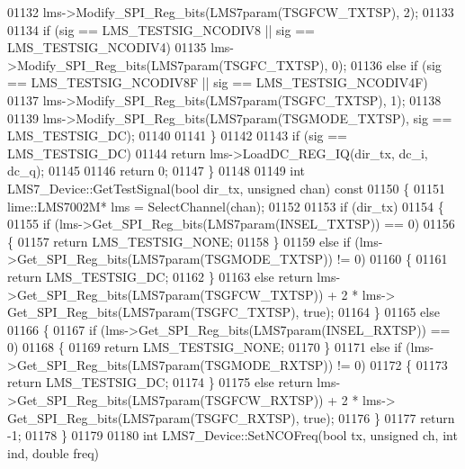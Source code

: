 \begin{DoxyCode}
{{{01132             lms->Modify_SPI_Reg_bits(LMS7param(TSGFCW_TXTSP), 2);
01133 
01134         \textcolor{keywordflow}{if} (sig == LMS_TESTSIG_NCODIV8 || sig == LMS_TESTSIG_NCODIV4)
01135             lms->Modify_SPI_Reg_bits(LMS7param(TSGFC_TXTSP), 0);
01136         \textcolor{keywordflow}{else} \textcolor{keywordflow}{if} (sig == LMS_TESTSIG_NCODIV8F || sig == LMS_TESTSIG_NCODIV4F)
01137             lms->Modify_SPI_Reg_bits(LMS7param(TSGFC_TXTSP), 1);
01138 
01139         lms->Modify_SPI_Reg_bits(LMS7param(TSGMODE_TXTSP), sig == LMS_TESTSIG_DC);
01140 
01141     \}
01142 
01143     \textcolor{keywordflow}{if} (sig == LMS_TESTSIG_DC)
01144         \textcolor{keywordflow}{return} lms->LoadDC_REG_IQ(dir\_tx, dc\_i, dc\_q);
01145 
01146     \textcolor{keywordflow}{return} 0;
01147 \}
01148 
01149 \textcolor{keywordtype}{int} LMS7_Device::GetTestSignal(\textcolor{keywordtype}{bool} dir_tx, \textcolor{keywordtype}{unsigned} chan)\textcolor{keyword}{ const}
01150 \textcolor{keyword}{}\{
01151     lime::LMS7002M* lms = SelectChannel(chan);
01152 
01153     \textcolor{keywordflow}{if} (dir\_tx)
01154     \{
01155         \textcolor{keywordflow}{if} (lms->Get_SPI_Reg_bits(LMS7param(INSEL_TXTSP)) == 0)
01156         \{
01157             \textcolor{keywordflow}{return} LMS_TESTSIG_NONE;
01158         \}
01159         \textcolor{keywordflow}{else} \textcolor{keywordflow}{if} (lms->Get_SPI_Reg_bits(LMS7param(TSGMODE_TXTSP)) != 0)
01160         \{
01161             \textcolor{keywordflow}{return} LMS_TESTSIG_DC;
01162         \}
01163         \textcolor{keywordflow}{else} \textcolor{keywordflow}{return} lms->Get_SPI_Reg_bits(LMS7param(TSGFCW_TXTSP)) + 2 * lms->
      Get_SPI_Reg_bits(LMS7param(TSGFC_TXTSP), \textcolor{keyword}{true});
01164     \}
01165     \textcolor{keywordflow}{else}
01166     \{
01167         \textcolor{keywordflow}{if} (lms->Get_SPI_Reg_bits(LMS7param(INSEL_RXTSP)) == 0)
01168         \{
01169             \textcolor{keywordflow}{return} LMS_TESTSIG_NONE;
01170         \}
01171         \textcolor{keywordflow}{else} \textcolor{keywordflow}{if} (lms->Get_SPI_Reg_bits(LMS7param(TSGMODE_RXTSP)) != 0)
01172         \{
01173             \textcolor{keywordflow}{return} LMS_TESTSIG_DC;
01174         \}
01175         \textcolor{keywordflow}{else} \textcolor{keywordflow}{return} lms->Get_SPI_Reg_bits(LMS7param(TSGFCW_RXTSP)) + 2 * lms->
      Get_SPI_Reg_bits(LMS7param(TSGFC_RXTSP), \textcolor{keyword}{true});
01176     \}
01177     \textcolor{keywordflow}{return} -1;
01178 \}
01179 
01180 \textcolor{keywordtype}{int} LMS7_Device::SetNCOFreq(\textcolor{keywordtype}{bool} tx, \textcolor{keywordtype}{unsigned} ch, \textcolor{keywordtype}{int} ind, \textcolor{keywordtype}{double} freq)
}}}
\end{DoxyCode}
